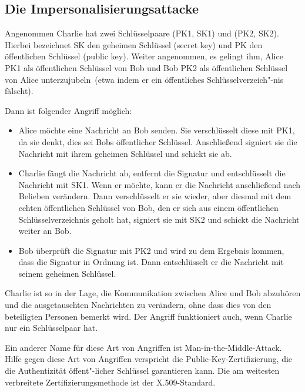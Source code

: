 \begin{refsegment}
\subsection{Die Impersonalisierungsattacke}
\label{Impersonalisierungsattacke}
 

Angenommen Charlie hat zwei Schlüsselpaare (PK1, SK1) und (PK2, SK2).
Hierbei bezeichnet SK den geheimen Schlüssel (secret key) und PK den
öffentlichen Schlüssel (public key). Weiter angenommen, es gelingt ihm,
Alice PK1 als öffentlichen Schlüssel von Bob und Bob PK2 als
öffentlichen Schlüssel von Alice \glqq unterzujubeln\grqq~(etwa indem
er ein öffentliches Schlüsselverzeich"-nis fälscht).

Dann ist folgender Angriff möglich:
\begin{itemize}
    \item Alice möchte eine Nachricht an Bob senden. Sie verschlüsselt diese
          mit PK1, da sie denkt, dies sei Bobs öffentlicher Schlüssel.
          Anschließend signiert sie die Nachricht mit ihrem geheimen
         Schlüssel und schickt sie ab.
    \item Charlie fängt die Nachricht ab, entfernt die Signatur und
          entschlüsselt die Nachricht mit SK1. Wenn er möchte, kann er die
          Nachricht anschließend nach Belieben verändern. Dann
          verschlüsselt er sie wieder, aber diesmal mit dem echten
          öffentlichen Schlüssel von Bob, den er sich aus einem
          öffentlichen Schlüsselverzeichnis geholt hat, signiert sie mit
          SK2 und schickt die Nachricht weiter an Bob.
    \item Bob überprüft die Signatur mit PK2 und wird zu dem Ergebnis
          kommen, dass die Signatur in Ordnung ist. Dann entschlüsselt er
          die Nachricht mit seinem geheimen Schlüssel.
\end{itemize}

Charlie ist so in der Lage, die Kommunikation zwischen Alice und Bob
abzuhören und die ausgetauschten Nachrichten zu verändern, ohne dass dies
von den beteiligten Personen bemerkt wird. Der Angriff funktioniert
auch, wenn Charlie nur ein Schlüsselpaar hat.

Ein anderer Name für diese Art von Angriffen ist
\glqq Man-in-the-Middle-Attack\grqq. Hilfe gegen diese Art von Angriffen
verspricht die Public-Key-Zertifizierung, die die 
Authentizität öffent"-licher Schlüssel garantieren kann. Die am weitesten
verbreitete Zertifizierungsmethode ist der X.509-Standard.


\end{refsegment}
